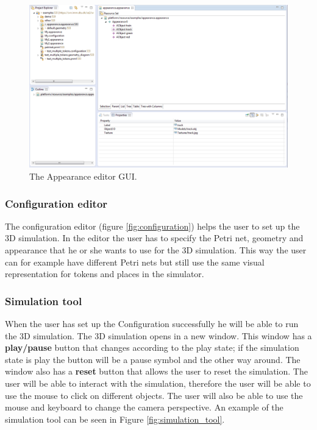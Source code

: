 \begin{figure}[ht]
\begin{center}
\includegraphics[scale=0.45]{image/ui/appearance.png}
\caption{The Appearance editor GUI.}
\label{fig:appearance_editor}
\end{center}
\end{figure}

\subsubsection{Configuration editor}
The configuration editor (figure \ref{fig:configuration}) helps the user to set up the 3D simulation. In the editor the user has to specify the Petri net, geometry and appearance that he or she wants to use for the 3D simulation. This way the user can for example have different Petri nets but still use the same visual representation for tokens and places in the simulator.

\subsubsection{Simulation tool}
When the user has set up the Configuration successfully he will be able to run the 3D simulation. The 3D simulation opens in a new window. This window has a \textbf{play/pause} button that changes according to the play state; if the simulation state is play the button will be a pause symbol and the other way around. The window also has a \textbf{reset} button that allows the user to reset the simulation.
The user will be able to interact with the simulation, therefore the user will be able to use the mouse to click on different objects. The user will also be able to use the mouse and keyboard to change the camera perspective. An example of the simulation tool can be seen in Figure \ref{fig:simulation_tool}.

